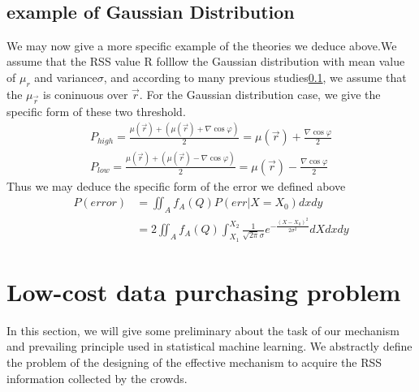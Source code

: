\documentclass[10pt,conference,compsocconf,letterpaper]{IEEEtran}
\begin{document}
\begin{IEEEproof}
\\
\\
\\
\\
\\
\\
\\
\\
\\
\\
\\
\end{IEEEproof}

\subsection{example of Gaussian Distribution}
We may now give a more specific example of the theories we deduce above.We assume that the RSS value R folllow the Gaussian distribution with mean value of $\mu_{r}$ and variance$\sigma$, and according to many previous studies\ref{}, we assume that the $\mu_{\vec r}$ is coninuous over $\vec r$.
For the Gaussian distribution case, we give the specific form of these two threshold.
\begin{equation}
\begin{aligned}
{P_{high}} = \frac{{\mu (\vec r) + (\mu (\vec r) + \nabla \cos \varphi )}}{2} = \mu (\vec r) + \frac{{\nabla \cos \varphi }}{2}\\
{P_{low}} = \frac{{\mu (\vec r) + (\mu (\vec r) - \nabla \cos \varphi )}}{2} = \mu (\vec r) - \frac{{\nabla \cos \varphi }}{2}
\end{aligned}
\end{equation}
Thus we may deduce the specific form of the error we defined above
\begin{equation}
\begin{aligned}
P(error) &= \iint_A {{f_A}}(Q)P(err|X = {X_0})dxdy\\
&= 2\iint_A {{f_A}}(Q)\int_{{X_1}}^{{X_2}} {\frac{1}{{\sqrt {2\pi } \sigma }}{e^{ - \frac{{{{(X - {X_0})}^2}}}{{2{\sigma ^2}}}}}} dXdxdy
\end{aligned}
\end{equation}

\section{Low-cost data purchasing problem}\label{probdef}
In this section, we will give some preliminary about the task of our mechanism and prevailing principle used in statistical machine learning. We abstractly define the problem of the designing of the effective mechanism to acquire the RSS information collected by the crowds. 
\end{document}

